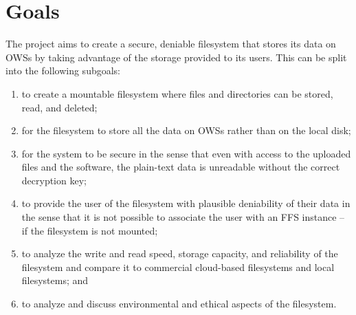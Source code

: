 
\section{Goals}


The project aims to create a secure, deniable filesystem that stores its data on \glspl{OWS} by taking advantage of the storage provided to its users. This can be split into the following subgoals:
\begin{enumerate}
\item to create a mountable filesystem where files and directories can be stored, read, and deleted;

\item for the filesystem to store all the data on \glspl{OWS} rather than on the local disk;

\item for the system to be secure in the sense that even with access to the uploaded files and the software, the \mbox{plain-text} data is unreadable without the correct decryption key;

\item to provide the user of the filesystem with plausible deniability of their data in the sense that it is not possible to associate the user with an \gls{FFS} instance -- if the filesystem is not mounted;

\item to analyze the write and read speed, storage capacity, and reliability of the filesystem and compare it to commercial \mbox{cloud-based} filesystems and local filesystems; and

\item to analyze and discuss environmental and ethical aspects of the filesystem.
\end{enumerate}

